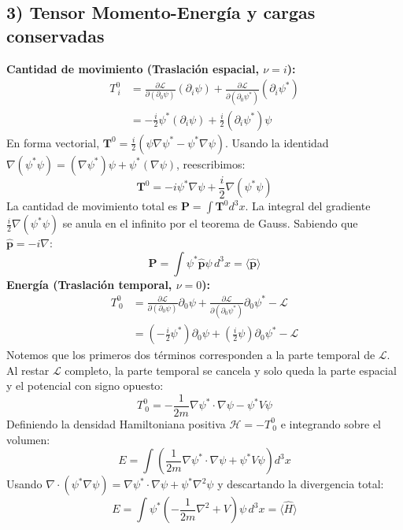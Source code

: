 \subsection*{3) Tensor Momento-Energía y cargas conservadas}
\textbf{Cantidad de movimiento (Traslación espacial, $\nu = i$):}
\begin{align}
    T^0_{\ i} &= \frac{\partial \mathcal{L}}{\partial(\partial_0\psi)} (\partial_i\psi) + \frac{\partial \mathcal{L}}{\partial(\partial_0\psi^*)} (\partial_i\psi^*) \nonumber \\
    &= -\frac{i}{2}\psi^*(\partial_i\psi) + \frac{i}{2}(\partial_i\psi^*)\psi
\end{align}
En forma vectorial, $\mathbf{T}^0 = \frac{i}{2}(\psi\nabla\psi^* - \psi^*\nabla\psi)$. Usando la identidad $\nabla(\psi^*\psi) = (\nabla\psi^*)\psi + \psi^*(\nabla\psi)$, reescribimos:
\begin{equation}
    \mathbf{T}^0 = -i\psi^*\nabla\psi + \frac{i}{2}\nabla(\psi^*\psi)
\end{equation}
La cantidad de movimiento total es $\mathbf{P} = \int \mathbf{T}^0 d^3x$. La integral del gradiente $\frac{i}{2}\nabla(\psi^*\psi)$ se anula en el infinito por el teorema de Gauss. Sabiendo que $\mathbf{\hat{p}} = -i\nabla$:
\begin{equation}
    \mathbf{P} = \int \psi^* \mathbf{\hat{p}} \psi \, d^3x = \langle \mathbf{\hat{p}} \rangle
\end{equation}
\textbf{Energía (Traslación temporal, $\nu = 0$):}
\begin{align}
    T^0_{\ 0} &= \frac{\partial \mathcal{L}}{\partial(\partial_0\psi)}\partial_0\psi + \frac{\partial \mathcal{L}}{\partial(\partial_0\psi^*)}\partial_0\psi^* - \mathcal{L} \nonumber \\
    &= \left(-\frac{i}{2}\psi^*\right)\partial_0\psi + \left(\frac{i}{2}\psi\right)\partial_0\psi^* - \mathcal{L}
\end{align}
Notemos que los primeros dos términos corresponden a la parte temporal de $\mathcal{L}$. Al restar $\mathcal{L}$ completo, la parte temporal se cancela y solo queda la parte espacial y el potencial con signo opuesto:
\begin{equation}
    T^0_{\ 0} = -\frac{1}{2m} \nabla\psi^* \cdot \nabla\psi - \psi^* V \psi
\end{equation}
Definiendo la densidad Hamiltoniana positiva $\mathcal{H} = -T^0_{\ 0}$ e integrando sobre el volumen:
\begin{equation}
    E = \int \left( \frac{1}{2m} \nabla\psi^* \cdot \nabla\psi + \psi^* V \psi \right) d^3x
\end{equation}
Usando $\nabla \cdot (\psi^*\nabla\psi) = \nabla\psi^* \cdot \nabla\psi + \psi^*\nabla^2\psi$ y descartando la divergencia total:
\begin{equation}
    E = \int \psi^* \left( -\frac{1}{2m}\nabla^2 + V \right) \psi \, d^3x = \langle \hat{H} \rangle
\end{equation}

